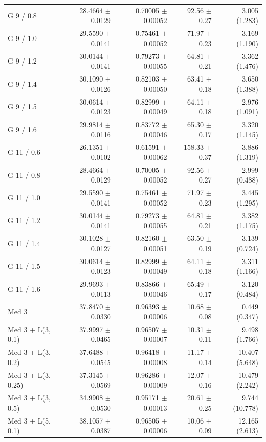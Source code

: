 \begin{longtable}{lrrrr}
G 9 / 0.8 & 28.4664 $\pm$ 0.0129 & 0.70005 $\pm$ 0.00052 & 92.56 $\pm$ 0.27 & 3.005 (1.283) \\
G 9 / 1.0 & 29.5590 $\pm$ 0.0141 & 0.75461 $\pm$ 0.00052 & 71.97 $\pm$ 0.23 & 3.169 (1.190) \\
G 9 / 1.2 & 30.0144 $\pm$ 0.0141 & 0.79273 $\pm$ 0.00055 & 64.81 $\pm$ 0.21 & 3.362 (1.476) \\
G 9 / 1.4 & 30.1090 $\pm$ 0.0126 & 0.82103 $\pm$ 0.00050 & 63.41 $\pm$ 0.18 & 3.650 (1.388) \\
G 9 / 1.5 & 30.0614 $\pm$ 0.0123 & 0.82999 $\pm$ 0.00049 & 64.11 $\pm$ 0.18 & 2.976 (1.091) \\
G 9 / 1.6 & 29.9814 $\pm$ 0.0116 & 0.83772 $\pm$ 0.00046 & 65.30 $\pm$ 0.17 & 3.320 (1.145) \\
G 11 / 0.6 & 26.1351 $\pm$ 0.0102 & 0.61591 $\pm$ 0.00062 & 158.33 $\pm$ 0.37 & 3.886 (1.319) \\
G 11 / 0.8 & 28.4664 $\pm$ 0.0129 & 0.70005 $\pm$ 0.00052 & 92.56 $\pm$ 0.27 & 2.999 (0.488) \\
G 11 / 1.0 & 29.5590 $\pm$ 0.0141 & 0.75461 $\pm$ 0.00052 & 71.97 $\pm$ 0.23 & 3.445 (1.295) \\
G 11 / 1.2 & 30.0144 $\pm$ 0.0141 & 0.79273 $\pm$ 0.00055 & 64.81 $\pm$ 0.21 & 3.382 (1.175) \\
G 11 / 1.4 & 30.1028 $\pm$ 0.0127 & 0.82160 $\pm$ 0.00051 & 63.50 $\pm$ 0.19 & 3.139 (0.724) \\
G 11 / 1.5 & 30.0614 $\pm$ 0.0123 & 0.82999 $\pm$ 0.00049 & 64.11 $\pm$ 0.18 & 3.311 (1.166) \\
G 11 / 1.6 & 29.9693 $\pm$ 0.0113 & 0.83866 $\pm$ 0.00046 & 65.49 $\pm$ 0.17 & 3.120 (0.484) \\
Med 3 & 37.8470 $\pm$ 0.0330 & 0.96393 $\pm$ 0.00006 & 10.68 $\pm$ 0.08 & 0.449 (0.347) \\
Med 3 + L(3, 0.1) & 37.9997 $\pm$ 0.0465 & 0.96507 $\pm$ 0.00007 & 10.31 $\pm$ 0.11 & 9.498 (1.766) \\
Med 3 + L(3, 0.2) & 37.6488 $\pm$ 0.0545 & 0.96418 $\pm$ 0.00008 & 11.17 $\pm$ 0.14 & 10.407 (5.648) \\
Med 3 + L(3, 0.25) & 37.3145 $\pm$ 0.0569 & 0.96286 $\pm$ 0.00009 & 12.07 $\pm$ 0.16 & 10.479 (2.242) \\
Med 3 + L(3, 0.5) & 34.9908 $\pm$ 0.0530 & 0.95171 $\pm$ 0.00013 & 20.61 $\pm$ 0.25 & 9.744 (10.778) \\
Med 3 + L(5, 0.1) & 38.1057 $\pm$ 0.0387 & 0.96505 $\pm$ 0.00006 & 10.06 $\pm$ 0.09 & 12.165 (2.613) \\

\end{longtable}

